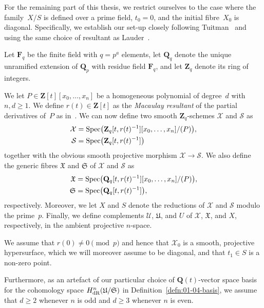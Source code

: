For the remaining part of this thesis, we restrict ourselves to the case 
where the family~$X/S$ is defined over a prime field, $t_0 = 0$, and the 
initial fibre~$X_0$ is diagonal.  Specifically, we establish our set-up 
closely following Tuitman~\citep[\S 3.6]{Tuitman2011} and using the same 
choice of resultant as Lauder~\citep[\S 2.3.2]{Lauder2011}.

\begin{notation} \label{not:01-02-main}
Let $\mathbf{F}_q$ be the finite field with $q = p^a$ elements, 
let $\mathbf{Q}_q$ denote the unique unramified extension of $\mathbf{Q}_p$ 
with residue field $\mathbf{F}_q$, and let $\mathbf{Z}_q$ denote its 
ring of integers.

We let $P \in \mathbf{Z}[t][x_0,\dotsc,x_n]$ be a homogeneous polynomial 
of degree~$d$ with $n, d \geq 1$.  We define $r(t) \in \mathbf{Z}[t]$ as 
the \emph{Macaulay resultant} of the partial derivatives of~$P$ as 
in~\citep[Page~7, Chapter~I.6]{Macaulay1994}.  We can now define two 
smooth $\mathbf{Z}_q$-schemes $\mathcal{X}$ and $\mathcal{S}$ as 
\begin{align*}
\mathcal{X} & = \operatorname{Spec}\bigl( \mathbf{Z}_q[t,r(t)^{-1}][x_0,\dotsc,x_n] / (P)\bigr), \\
\mathcal{S} & = \operatorname{Spec}\bigl( \mathbf{Z}_q[t,r(t)^{-1}] \bigr)
\end{align*}
together with the obvious smooth projective morphism 
$\mathcal{X} \to \mathcal{S}$.  We also define the generic fibres 
$\mathfrak{X}$ and $\mathfrak{S}$ of $\mathcal{X}$ and $\mathcal{S}$ as 
\begin{align*}
\mathfrak{X} & = \operatorname{Spec}\bigl( \mathbf{Q}_q[t,r(t)^{-1}][x_0,\dotsc,x_n] / (P)\bigr), \\
\mathfrak{S} & = \operatorname{Spec}\bigl( \mathbf{Q}_q[t,r(t)^{-1}] \bigr),
\end{align*}
respectively.  Moreover, we let $X$ and $S$ denote the reductions 
of $\mathcal{X}$ and $\mathcal{S}$ modulo the prime~$p$. 
Finally, we define complements $\mathcal{U}$, $\mathfrak{U}$, and $U$ 
of $\mathcal{X}$, $\mathfrak{X}$, and $X$, respectively, in the 
ambient projective $n$-space.

We assume that $r(0) \neq 0 \pmod{p}$ and hence that $\mathcal{X}_0$ is 
a smooth, projective hypersurface, which we will moreover assume to be 
diagonal, and that $t_1 \in S$ is a non-zero point.
\end{notation}

\begin{notation}
Furthermore, as an artefact of our particular choice of $\mathbf{Q}(t)$-vector 
space basis for the cohomology space $H_{\text{dR}}^n(\mathfrak{U}/\mathfrak{S})$ 
in Definition~\ref{defn:01-04-basis}, we assume that $d \geq 2$ 
whenever $n$ is odd and $d \geq 3$ whenever $n$ is even.
\end{notation}


